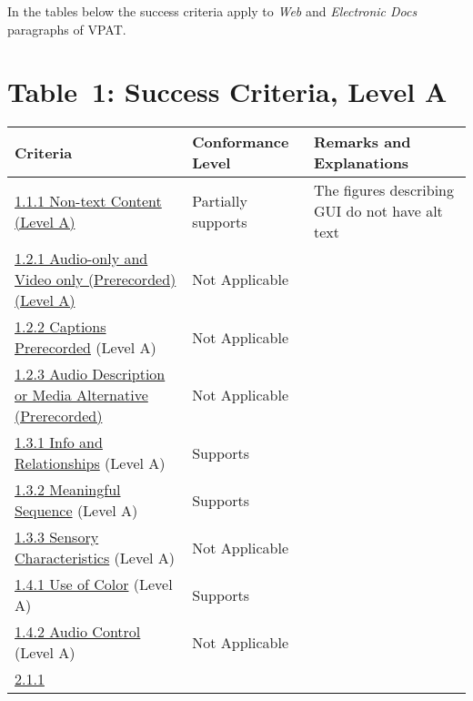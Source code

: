 \documentclass[a4paper]{report}
\begin{document}
In the tables below the success criteria apply to \emph{Web} and
\emph{Electronic Docs} paragraphs of VPAT.


\section{Table~1:  Success Criteria, Level A}
\begin{longtable}{p{}<{\RaggedRight}p{}<{\RaggedRight}p{}<{\RaggedRight}}
  \toprule
  Criteria & Conformance Level & Remarks and Explanations \\
  \midrule
  \endhead
  \bottomrule
  \endfoot
	\href{https://www.w3.org/TR/WCAG20/#text-equiv-all}{1.1.1
  Non-text Content (Level A)} & Partially supports & The figures
                                                     describing GUI do
                                                     not have alt
                                                     text\\
        \href{https://www.w3.org/TR/WCAG20/#media-equiv-av-only-alt}{1.2.1
  Audio-only and Video only (Prerecorded) (Level A)} & Not Applicable\\
  \href{https://www.w3.org/TR/WCAG20/#media-equiv-captions}{1.2.2
  Captions Prerecorded} (Level A) & Not Applicable\\
        \href{http://www.w3.org/TR/WCAG20/#media-equiv-audio-desc}{1.2.3
                                    Audio Description or Media
                                    Alternative (Prerecorded)}
                               & Not Applicable\\
        \href{http://www.w3.org/TR/WCAG20/#content-structure-separation-programmatic}{1.3.1
  Info and Relationships} (Level A) & Supports \\
    \href{http://www.w3.org/TR/WCAG20/#content-structure-separation-programmatic}{1.3.2
  Meaningful Sequence} (Level A) & Supports \\
  \href{http://www.w3.org/TR/WCAG20/#content-structure-separation-understanding}{1.3.3
  Sensory Characteristics} (Level A) & Not Applicable\\
  \href{http://www.w3.org/TR/WCAG20/#visual-audio-contrast-without-color}{1.4.1
  Use of Color} (Level A) & Supports \\
  \href{http://www.w3.org/TR/WCAG20/#visual-audio-contrast-dis-audio}{1.4.2
  Audio Control} (Level A) & Not Applicable\\
  \href{http://www.w3.org/TR/WCAG20/#keyboard-operation-keyboard-operable}{2.1.1
}
\end{longtable}
\end{document}
